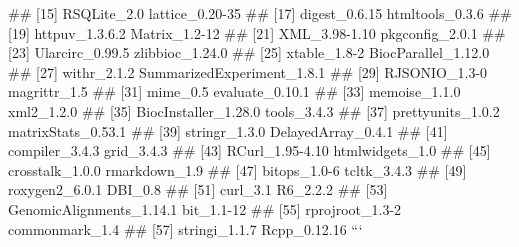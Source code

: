 ## [15] RSQLite_2.0                   lattice_0.20-35              
## [17] digest_0.6.15                 htmltools_0.3.6              
## [19] httpuv_1.3.6.2                Matrix_1.2-12                
## [21] XML_3.98-1.10                 pkgconfig_2.0.1              
## [23] Ularcirc_0.99.5               zlibbioc_1.24.0              
## [25] xtable_1.8-2                  BiocParallel_1.12.0          
## [27] withr_2.1.2                   SummarizedExperiment_1.8.1   
## [29] RJSONIO_1.3-0                 magrittr_1.5                 
## [31] mime_0.5                      evaluate_0.10.1              
## [33] memoise_1.1.0                 xml2_1.2.0                   
## [35] BiocInstaller_1.28.0          tools_3.4.3                  
## [37] prettyunits_1.0.2             matrixStats_0.53.1           
## [39] stringr_1.3.0                 DelayedArray_0.4.1           
## [41] compiler_3.4.3                grid_3.4.3                   
## [43] RCurl_1.95-4.10               htmlwidgets_1.0              
## [45] crosstalk_1.0.0               rmarkdown_1.9                
## [47] bitops_1.0-6                  tcltk_3.4.3                  
## [49] roxygen2_6.0.1                DBI_0.8                      
## [51] curl_3.1                      R6_2.2.2                     
## [53] GenomicAlignments_1.14.1      bit_1.1-12                   
## [55] rprojroot_1.3-2               commonmark_1.4               
## [57] stringi_1.1.7                 Rcpp_0.12.16
```


